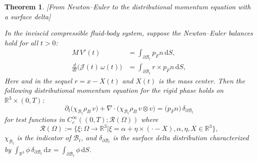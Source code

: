 \documentclass[10pt,a4paper]{amsart}
\newtheorem{theorem}{Theorem}
\begin{document}
\begin{theorem}\label{thm:ApendixA}[From Newton--Euler to the distributional momentum equation with a surface delta]

In the inviscid compressible fluid-body system, suppose the Newton--Euler balances hold for all $t>0$:
\begin{align}
M\,{V}'(t) &= \int_{\partial\mathcal{B}_t}  p_Fn \, \mathrm{d}S, \label{NE-lin}\\
\frac{d}{dt}\big(\mathcal J(t)\,\omega(t)\big)
&= \int_{\partial\mathcal{B}_t} r \times p_Fn \, \mathrm{d}S, \label{NE-ang}
\end{align}
Here and in the sequel $r=x-X(t)$ and $X(t)$ is the mass center. Then the following \emph{distributional} momentum equation for the rigid phase holds on $\mathbb R^3\times(0,T)$:
\begin{equation}
\partial_t\big(\chi_{\mathcal{B}_t}\rho_B\, v\big)+\nabla\!\cdot\!\big(\chi_{\mathcal{B}_t}\rho_B\, v\otimes v\big)
= \big( p_Fn\big)\,\delta_{\partial\mathcal{B}_t}
\label{PDE-delta}
\end{equation}
for test functions in $C_c^\infty((0,T);\mathcal{R}(\Omega))$ where  
\begin{equation}
    \mathcal{R}(\Omega):=\{\xi:\Omega\to\mathbb{R}^3 \big| \xi=\alpha+\eta\times(\cdot-X), \alpha,\eta,X\in \mathbb{R}^3 \},
\end{equation}
$\chi_{\mathcal{B}_t}$ is the indicator of $\mathcal B_t$, and $\delta_{\partial\mathcal{B}_t}$ is the surface delta distribution
characterized by $\int_{\mathbb R^3}\phi\,\delta_{\partial\mathcal{B}_t}\,\mathrm{d}x=\int_{\partial\mathcal{B}_t}\phi\,\mathrm{d}S$.
\end{theorem}
\end{document}

